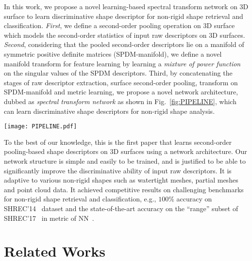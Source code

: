 \documentclass[runningheads]{llncs}
\begin{document}
In this work, we propose a novel learning-based spectral transform network on 3D surface to learn discriminative shape descriptor for non-rigid shape retrieval and classification. 
\textit{First}, we define a second-order pooling operation on 3D surface which models the second-order statistics of input raw descriptors on 3D surfaces. \textit{Second}, considering that the pooled second-order descriptors lie on a manifold of symmetric positive definite matrices (SPDM-manifold), we define a novel manifold transform for feature learning by learning a \emph{mixture of power function} on the singular values of the SPDM descriptors. Third, by concatenating the stages of raw descriptor extraction, surface second-order pooling, transform on SPDM-manifold and metric learning, we propose a novel network architecture, dubbed as \emph{spectral transform network} as shown in Fig.~\ref{fig:PIPELINE}, which can learn discriminative shape descriptors for non-rigid shape analysis.
\begin{figure*}[t]
\begin{center}
\texttt{[image: PIPELINE.pdf]}
\caption{Architecture of our proposed ST-Net. It consists of four stages, i.e., raw descriptor extraction, surface second-order pooling, SPDM-manifold transform and metric learning.}
\label{fig:PIPELINE}
\end{center}
\end{figure*}

To the best of our knowledge, this is the first paper that learns second-order pooling-based shape descriptors on 3D surfaces using a network architecture. Our network structure is simple and easily to be trained, and is justified to be able to significantly improve the  discriminative ability of input raw descriptors. It is adaptive to various non-rigid shapes such as watertight meshes, partial meshes and point cloud data. It achieved competitive results on challenging benchmarks for non-rigid shape retrieval and classification, e.g., $100\%$ accuracy  on SHREC'14~\cite{SHREC} dataset and the state-of-the-art accuracy on the ``range'' subset of SHREC'17~\cite{Masoumi2017SHREC} in metric of NN~\cite{Philip}.


\section{Related Works}
\end{document}
